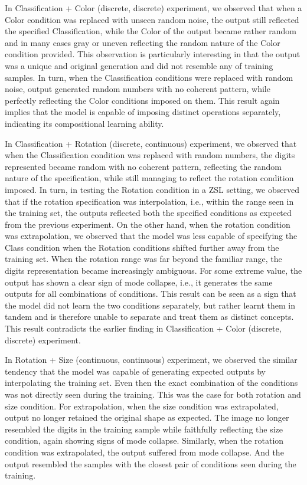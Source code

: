 \documentclass[11pt, letterpaper, oneside]{article}
\begin{document}
In Classification + Color (discrete, discrete) experiment, we observed that when a Color condition was replaced with unseen random noise, the output still reflected the specified Classification, while the Color of the output became rather random and in many cases gray or uneven reflecting the random nature of the Color condition provided. This observation is particularly interesting in that the output was a unique and original generation and did not resemble any of training samples. In turn, when the Classification conditions were replaced with random noise, output generated random numbers with no coherent pattern, while perfectly reflecting the Color conditions imposed on them. This result again implies that the model is capable of imposing distinct operations separately, indicating its compositional learning ability. 

In Classification + Rotation (discrete, continuous) experiment, we observed that when the Classification condition was replaced with random numbers, the digits represented became random with no coherent pattern, reflecting the random nature of the specification, while still managing to reflect the rotation condition imposed. In turn, in testing the Rotation condition in a ZSL setting, we observed that if the rotation specification was interpolation, i.e., within the range seen in the training set, the outputs reflected both the specified conditions as expected from the previous experiment. On the other hand, when the rotation condition was extrapolation, we observed that the model was less capable of specifying the Class condition when the Rotation conditions shifted further away from the training set. When the rotation range was far beyond the familiar range, the digits representation became increasingly ambiguous. For some extreme value, the output has shown a clear sign of mode collapse, i.e., it generates the same outputs for all combinations of conditions. This result can be seen as a sign that the model did not learn the two conditions separately, but rather learnt them in tandem and is therefore unable to separate and treat them as distinct concepts. This result contradicts the earlier finding in Classification + Color (discrete, discrete) experiment.   

In Rotation + Size (continuous, continuous) experiment, we observed the similar tendency that the model was capable of generating expected outputs by interpolating the training set. Even then the exact combination of the conditions was not directly seen during the training. This was the case for both rotation and size condition. For extrapolation, when the size condition was extrapolated, output no longer retained the original shape as expected. The image no longer resembled the digits in the training sample while faithfully reflecting the size condition, again showing signs of mode collapse. Similarly, when the rotation condition was extrapolated, the output suffered from mode collapse. And the output resembled the samples with the closest pair of conditions seen during the training.
\end{document}
